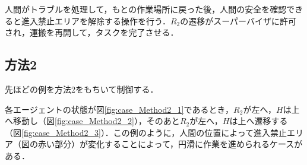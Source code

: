 人間がトラブルを処理して，もとの作業場所に戻った後，人間の安全を確認できると進入禁止エリアを解除する操作を行う．$R_2$の遷移がスーパーバイザに許可され，運搬を再開して，タスクを完了させる．

\subsection{方法2}

先ほどの例を方法2をもちいて制御する．

各エージェントの状態が図\ref{fig:case_Method2_1}であるとき，$R_2$が左へ，$H$は上へ移動し（図\ref{fig:case_Method2_2}），そのあと$R_2$が左へ，$H$は上へ遷移する（図\ref{fig:case_Method2_3}）．この例のように，人間の位置によって進入禁止エリア（図の赤い部分）が変化することによって，円滑に作業を進められるケースがある．

